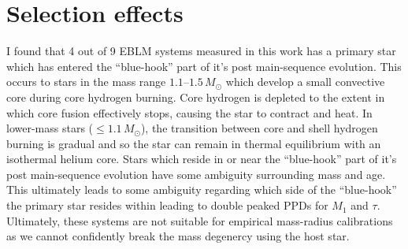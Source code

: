 		
		
		
		
		
		
		

		
		

		
\section{Selection effects}\label{discuss:selection}

I found that 4 out of 9 EBLM systems measured in this work has a primary star which has entered the ``blue-hook'' part of it's post main-sequence evolution. This occurs to stars in the mass range $1.1$--$1.5\,M_\odot$ which develop a small convective core during core hydrogen burning. Core hydrogen is depleted to the extent in which core fusion effectively stops, causing the star to contract and heat. In lower-mass stars ($\leq 1.1\,M_\odot$), the transition between core and shell hydrogen burning is gradual and so the star can remain in thermal equilibrium with an isothermal helium core. Stars which reside in or near the ``blue-hook'' part of it's post main-sequence evolution have some ambiguity surrounding mass and age. This ultimately leads to some ambiguity regarding which side of the ``blue-hook'' the primary star resides within leading to double peaked PPDs for $M_1$ and $\tau$. Ultimately, these systems are not suitable for empirical mass-radius calibrations as we cannot confidently break the mass degenercy using the host star. 

